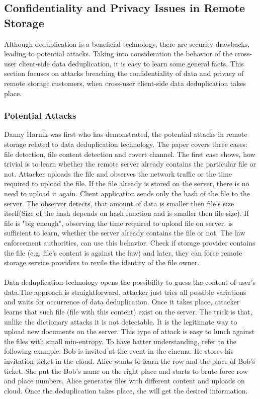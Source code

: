 \documentclass[12pt]{article}
\begin{document}
\subsection{Confidentiality and Privacy Issues in Remote Storage}
\label{sub:ConfidentialityAndPrivacy}
Although deduplication is a beneficial technology, there are security drawbacks, leading to potential attacks. Taking into consideration the behavior of the cross-user client-side data deduplication, it is easy to learn some general facts. This section focuses on attacks breaching the confidentiality of data and privacy of remote storage customers, when cross-user client-side data deduplication takes place.

\subsubsection{Potential Attacks}
\label{subsub:TypesOfDedup}
Danny Harnik was first who has demonstrated, the potential attacks in remote storage related to data deduplication technology.\cite{Harnik} The paper covers three cases: file detection, file content detection and covert channel. The first case shows, how  trivial is  to learn whether the remote server already contains the particular file or not. Attacker uploads the file and observes the network traffic or the time required to upload the file. If the file already is stored on the server, there is no need to upload it again. Client application sends only the 
hash of the file to the server. The observer detects, that amount of data is smaller then file's size itself(Size of the hash depends on hash function and is smaller then file size). If file is "big enough", observing the time required to upload file on server, is sufficient to learn, whether the server already contains the file or not. The law enforcement authorities, can use this behavior. Check if storage provider contains the file (e.g. file's content is against the law) and later, they can force remote storage service providers to revile the identity of the file owner.\\\\
Data deduplication technology opens the possibility to guess the content of user's data.The approach is straightforward, attacker just tries all possible variations and waits for occurrence of data deduplication. Once it takes place, attacker learns that such file (file with this content) exist on the server. The trick is that, unlike the dictionary attacks it is not detectable. It is the legitimate way to upload new documents on the server.\cite{Harnik} This type of attack is easy to lunch against the files with small min-entropy. To have batter understanding, refer to the following example. Bob is invited at the event in the cinema. He stores his invitation ticket in the cloud. Alice wants to learn the row and the place of Bob's ticket. She put the Bob's name on the right place and  starts to brute force row and place numbers. Alice generates files with different content and uploads on cloud. Once the deduplication takes place, she will get the desired information.\\\\
\end{document}

